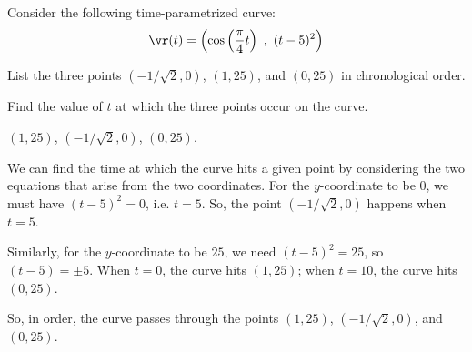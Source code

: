 



\subsection*{\Conceptual}

\begin{question}\label{prob_s1.0first}
Consider the following time-parametrized curve:
\[\vr(t)=\left( \cos\left(\frac{\pi}{4}t\right)~,~(t-5)^2\right)\]

List the three points $(-1/\sqrt{2},0)$, $(1,25)$, and $(0,25)$ in chronological order.
\end{question}
\begin{hint}
Find the value of $t$ at which the three points occur on the curve.
\end{hint}
\begin{answer}
$(1,25)$, $(-1/\sqrt2,0)$, $(0,25)$.
\end{answer}
\begin{solution}
We can find the time at which the curve hits a given point by considering the two equations that arise from the two coordinates. For the $y$-coordinate to be 0, we must have $(t-5)^2=0$, i.e. $t=5$. So, the point $(-1/\sqrt{2},0)$ happens when $t=5$.

Similarly, for the $y$-coordinate to be $25$,  we need $(t-5)^2=25$, so $(t-5)=\pm 5$.
When $t=0$, the curve hits $(1, 25)$; when $t=10$, the curve hits $(0,25)$.

So, in order, the curve passes through the points $(1,25)$, $(-1/\sqrt2,0)$, and $(0,25)$.
\end{solution}

